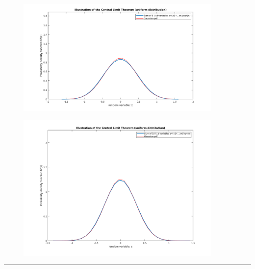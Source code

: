 \documentclass[12pt, letterpaper]{scrartcl}
\begin{document}
\begin{enumerate}[((a))]
\begin{figure}[H]
    \end{figure}
    \begin{figure}[H]
    \centering
    \includegraphics[width=0.9\textwidth]{hw5_figures/5.png}
    \end{figure}
    \begin{figure}[H]
    \centering
    \includegraphics[width=0.9\textwidth]{hw5_figures/10.png}
    \end{figure}
    
    
\end{enumerate}
\hrule
\end{document}
